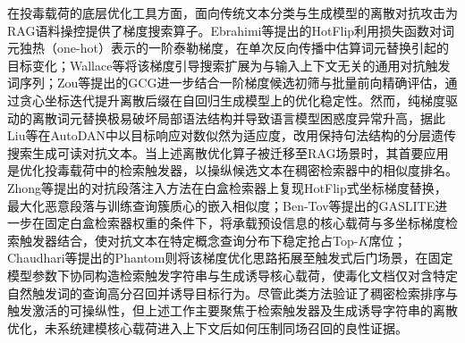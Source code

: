 在投毒载荷的底层优化工具方面，面向传统文本分类与生成模型的离散对抗攻击为RAG语料操控提供了梯度搜索算子。Ebrahimi等\cite{ebrahimi-etal-2018-hotflip}提出的HotFlip利用损失函数对词元独热（one-hot）表示的一阶泰勒梯度，在单次反向传播中估算词元替换引起的目标变化；Wallace等\cite{wallace2019universal}将该梯度引导搜索扩展为与输入上下文无关的通用对抗触发词序列；Zou等\cite{zou2023universal}提出的GCG进一步结合一阶梯度候选初筛与批量前向精确评估，通过贪心坐标迭代提升离散后缀在自回归生成模型上的优化稳定性。然而，纯梯度驱动的离散词元替换极易破坏局部语法结构并导致语言模型困惑度异常升高，据此Liu等\cite{liu2024autodan}在AutoDAN中以目标响应对数似然为适应度，改用保持句法结构的分层遗传搜索生成可读对抗文本。当上述离散优化算子被迁移至RAG场景时，其首要应用是优化投毒载荷中的检索触发器，以操纵候选文本在稠密检索器中的相似度排名。Zhong等\cite{zhong-etal-2023-poisoning}提出的对抗段落注入方法在白盒检索器上复现HotFlip式坐标梯度替换，最大化恶意段落与训练查询簇质心的嵌入相似度；Ben-Tov等\cite{ben2025gasliteing}提出的GASLITE进一步在固定白盒检索器权重的条件下，将承载预设信息的核心载荷与多坐标梯度检索触发器结合，使对抗文本在特定概念查询分布下稳定抢占Top-$K$席位；Chaudhari等\cite{chaudhari2026phantom}提出的Phantom则将该梯度优化思路拓展至触发式后门场景，在固定模型参数下协同构造检索触发字符串与生成诱导核心载荷，使毒化文档仅对含特定自然触发词的查询高分召回并诱导目标行为。尽管此类方法验证了稠密检索排序与触发激活的可操纵性，但上述工作主要聚焦于检索触发器及生成诱导字符串的离散优化，未系统建模核心载荷进入上下文后如何压制同场召回的良性证据。


